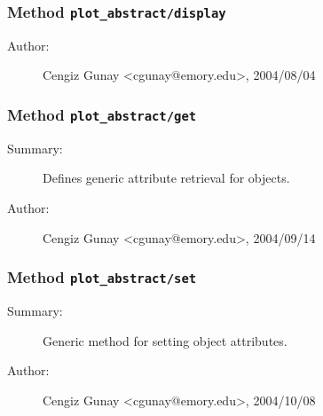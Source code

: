 \subsubsection[Method \texttt{display}]{Method \texttt{plot\_abstract/display}}%
%
\label{ref_plot_abstract__display}%
\hypertarget{ref_plot_abstract__display}{}%
\begin{description}
%
%
%
%
%
%
%
\item[Author:]%
Cengiz Gunay <cgunay@emory.edu>, 2004/08/04%
\end{description}
\methodline%
\subsubsection[Method \texttt{get}]{Method \texttt{plot\_abstract/get}}%
%
\label{ref_plot_abstract__get}%
\hypertarget{ref_plot_abstract__get}{}%
\begin{description}
\item[Summary:]Defines generic attribute retrieval for objects.
%
%
%
%
%
%
%
\item[Author:]%
Cengiz Gunay <cgunay@emory.edu>, 2004/09/14%
\end{description}
\methodline%
\subsubsection[Method \texttt{set}]{Method \texttt{plot\_abstract/set}}%
%
\label{ref_plot_abstract__set}%
\hypertarget{ref_plot_abstract__set}{}%
\begin{description}
\item[Summary:]Generic method for setting object attributes.
%
%
%
%
%
%
%
\item[Author:]%
Cengiz Gunay <cgunay@emory.edu>, 2004/10/08%
\end{description}
\methodline%
